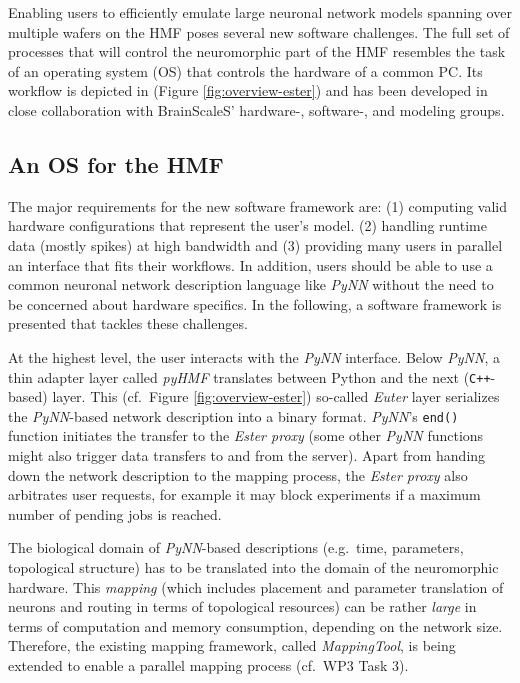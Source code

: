 \documentclass[12pt,oneside]{scrartcl}
\begin{document}
Enabling users to efficiently emulate large neuronal network models spanning over multiple wafers on the HMF poses several new software challenges.
%
The full set of processes that will control the neuromorphic part of the HMF resembles the task of an operating system (OS) that controls the hardware of a common PC.
%
Its workflow is depicted in (Figure \ref{fig:overview-ester}) and has been developed in close collaboration with BrainScaleS' hardware-, software-, and modeling groups.


\subsection*{An OS for the HMF}

The major requirements for the new software framework are: (1) computing valid hardware configurations that represent the user's model.
(2) handling runtime data (mostly spikes) at high bandwidth and (3) providing many users in parallel an interface that fits their workflows.
%
In addition, users should be able to use a common neuronal network description language like \emph{PyNN} without the need to be concerned about hardware specifics.
%
In the following, a software framework is presented that tackles these challenges.

At the highest level, the user interacts with the \emph{PyNN} interface.
%
Below \emph{PyNN}, a thin adapter layer called \emph{pyHMF} translates between Python and the next (\texttt{C++}-based) layer.
%
This (cf.\ Figure \ref{fig:overview-ester}) so-called \emph{Euter} layer serializes the \emph{PyNN}-based network description into a binary format.
\emph{PyNN}'s \texttt{end()} function initiates the transfer to the \emph{Ester proxy} (some other \emph{PyNN} functions might also trigger data transfers to and from the server).
%
Apart from handing down the network description to the mapping process, the \emph{Ester proxy} also arbitrates user requests, for example it may block experiments if a maximum number of pending jobs is reached.

The biological domain of \emph{PyNN}-based descriptions (e.g.\ time, parameters, topological structure) has to be translated into the domain of the neuromorphic hardware.
%
This \emph{mapping} (which includes placement and parameter translation of neurons and routing in terms of topological resources) can be rather \emph{large} in terms of computation and memory consumption, depending on the network size.
%
Therefore, the existing mapping framework, called \emph{MappingTool}, is being extended to enable a parallel mapping process (cf.\ WP3 Task 3).
\end{document}
